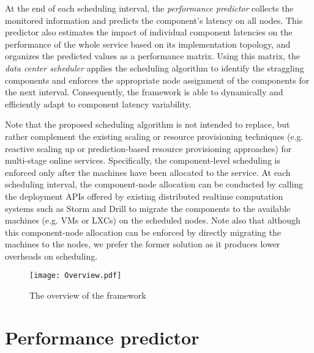 \documentclass[10pt, conference, compsocconf]{IEEEtran}
\begin{document}
At the end of each scheduling interval, the \emph{performance predictor} collects the monitored information and predicts the component's latency on all  nodes. This predictor also estimates the impact of individual component latencies on the performance of the whole service based on its implementation topology, and organizes the predicted values as a performance matrix. Using this matrix, the \emph{data center scheduler} applies the scheduling algorithm to identify the straggling components and enforces the appropriate node assignment of the components for the next interval. Consequently, the framework is able to dynamically and efficiently adapt to component latency variability.

Note that the proposed scheduling algorithm is not intended to replace, but rather complement the existing scaling or resource provisioning techniques (e.g. reactive scaling up \cite{han2012lightweight} or prediction-based resource provisioning \cite{calheiros2011virtual,han2014enabling} approaches) for multi-stage online services. Specifically, the component-level scheduling is enforced only after the machines have been allocated to the service. At each scheduling interval, the component-node allocation can be conducted by calling the deployment APIs offered by existing distributed realtime computation systems such as Storm \cite{StormWebsite} and Drill \cite{DrillWebsite} to migrate the components to the available machines (e.g. VMs or LXCs) on the scheduled nodes. Note also that although this component-node allocation can be enforced by directly migrating the machines to the nodes, we prefer the former solution as it produces lower overheads on scheduling.



\begin{figure}
\centering
  \texttt{[image: Overview.pdf]}\\
  \caption{The overview of the framework}
  \label{Fig: Overview}
\end{figure}

\section{Performance predictor} \label{Section: Performance predictor}
\end{document}
